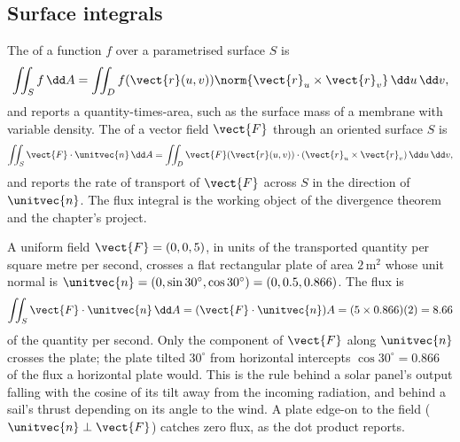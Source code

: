 \subsection{Surface integrals}

The  of a function $f$ over a
parametrised surface $S$ is
\[
\iint_{S} f \,\dd A = \iint_{D} f(\vect{r}(u, v))
\norm{\vect{r}_{u} \times \vect{r}_{v}} \,\dd u \,\dd v,
\]
and reports a quantity-times-area, such as the surface mass of a
membrane with variable density. The  of a
vector field $\vect{F}$ through an oriented surface $S$ is
\[
\iint_{S} \vect{F} \cdot \unitvec{n} \,\dd A =
\iint_{D} \vect{F}(\vect{r}(u, v)) \cdot
(\vect{r}_{u} \times \vect{r}_{v}) \,\dd u \,\dd v,
\]
and reports the rate of transport of $\vect{F}$ across $S$ in the
direction of $\unitvec{n}$. The flux integral is the working object
of the divergence theorem and the chapter's project.

\begin{example}
A uniform field $\vect{F} = (0, 0, 5)$, in units of the transported
quantity per square metre per second, crosses a flat rectangular
plate of area $2\,\si{\meter\squared}$ whose unit normal is
$\unitvec{n} = (0, \sin 30^{\circ}, \cos 30^{\circ}) = (0, 0.5,
0.866)$. The flux is
\[
\iint_{S}\vect{F}\cdot\unitvec{n}\,\dd A = (\vect{F}\cdot\unitvec{n})A
= (5\times 0.866)(2) = 8.66
\]
of the quantity per second. Only the component of $\vect{F}$ along
$\unitvec{n}$ crosses the plate; the plate tilted $30^{\circ}$ from
horizontal intercepts $\cos 30^{\circ} = 0.866$ of the flux a
horizontal plate would. This is the rule behind a solar panel's
output falling with the cosine of its tilt away from the incoming
radiation, and behind a sail's thrust depending on its angle to the
wind. A plate edge-on to the field ($\unitvec{n}\perp\vect{F}$)
catches zero flux, as the dot product reports.
\end{example}

